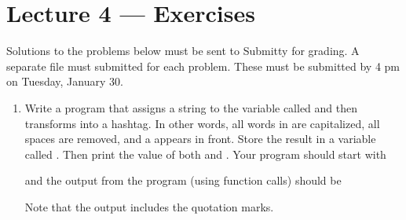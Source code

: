 \documentclass[letterpaper,10pt,english]{sphinxmanual}
\begin{document}
\chapter{Lecture 4 — Exercises}
\label{\detokenize{lecture_notes/lec04_modules_functions1_exercises/exercises:lecture-4-exercises}}\label{\detokenize{lecture_notes/lec04_modules_functions1_exercises/exercises::doc}}
Solutions to the problems below must be sent to Submitty for grading.
A separate file must submitted for each problem.  These must be
submitted by 4 pm on Tuesday, January 30.
\begin{enumerate}
\item {} 
Write a program that assigns a string to the variable called
 and then transforms  into a hashtag.  In other
words, all words in  are capitalized, all spaces are
removed, and a \sphinxcode{\sphinxupquote{\#}} appears in front.  Store the result in a
variable called .  Then print the value of both
 and .  Your program should start with

%
\begin{sphinxVerbatim}[commandchars=\\\{\}]
  
\end{sphinxVerbatim}

and the output from the program (using  function
calls) should be

%
\begin{sphinxVerbatim}[commandchars=\\\{\}]
  
   
\end{sphinxVerbatim}

Note that the output includes the quotation marks.


\end{enumerate}
\end{document}
